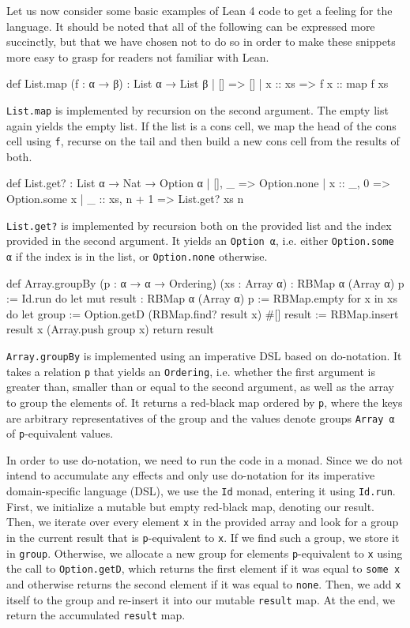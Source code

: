 Let us now consider some basic examples of Lean 4 code to get a feeling for the language. It should be noted that all of the following can be expressed more succinctly, but that we have chosen not to do so in order to make these snippets more easy to grasp for readers not familiar with Lean.
\begin{code}
def List.map (f : α → β) : List α → List β
  | []      => []
  | x :: xs => f x :: map f xs
\end{code}
\lstinline|List.map| is implemented by recursion on the second argument. The empty list again yields the empty list. If the list is a cons cell, we map the head of the cons cell using \lstinline|f|, recurse on the tail and then build a new cons cell from the results of both.
\begin{code}
def List.get? : List α → Nat → Option α
  | [],      _     => Option.none
  | x :: _,  0     => Option.some x
  | _ :: xs, n + 1 => List.get? xs n
\end{code}
\lstinline|List.get?| is implemented by recursion both on the provided list and the index provided in the second argument. It yields an \lstinline|Option α|, i.e. either \lstinline|Option.some α| if the index is in the list, or \lstinline|Option.none| otherwise.
\begin{code}
def Array.groupBy (p : α → α → Ordering) (xs : Array α)
  : RBMap α (Array α) p := Id.run do
  let mut result : RBMap α (Array α) p := RBMap.empty
  for x in xs do
    let group := Option.getD (RBMap.find? result x) #[]
    result := RBMap.insert result x (Array.push group x)
  return result
\end{code}
\lstinline|Array.groupBy| is implemented using an imperative DSL based on do-notation. It takes a relation \lstinline|p| that yields an \lstinline|Ordering|, i.e. whether the first argument is greater than, smaller than or equal to the second argument, as well as the array to group the elements of. It returns a red-black map ordered by \lstinline|p|, where the keys are arbitrary representatives of the group and the values denote groups \lstinline|Array α| of \lstinline|p|-equivalent values.

In order to use do-notation, we need to run the code in a monad. Since we do not intend to accumulate any effects and only use do-notation for its imperative domain-specific language (DSL), we use the \lstinline|Id| monad, entering it using \lstinline|Id.run|. First, we initialize a mutable but empty red-black map, denoting our result. Then, we iterate over every element \lstinline|x| in the provided array and look for a group in the current result that is \lstinline|p|-equivalent to \lstinline|x|. If we find such a group, we store it in \lstinline|group|. Otherwise, we allocate a new group for elements \lstinline|p|-equivalent to \lstinline|x| using the call to \lstinline|Option.getD|, which returns the first element if it was equal to \lstinline|some x| and otherwise returns the second element if it was equal to \lstinline|none|. Then, we add \lstinline|x| itself to the group and re-insert it into our mutable \lstinline|result| map. At the end, we return the accumulated \lstinline|result| map.

